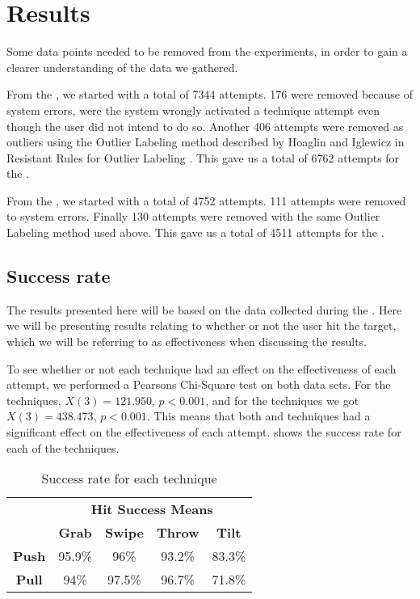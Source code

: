 \section{Results}\label{sec:results}
Some data points needed to be removed from the experiments, in order to gain a clearer understanding of the data we gathered. 

From the \target, we started with a total of 7344 attempts.
176 were removed because of system errors, were the system wrongly activated a technique attempt even though the user did not intend to do so.
Another 406 attempts were removed as outliers using the Outlier Labeling method described by Hoaglin and Iglewicz in Resistant Rules for Outlier Labeling \cite{Hoaglin:1987}.
This gave us a total of 6762 attempts for the \target.

From the \accuracy, we started with a total of 4752 attempts.
111 attempts were removed to system errors. 
Finally 130 attempts were removed with the same Outlier Labeling method used above.
This gave us a total of 4511 attempts for the \accuracy.

\subsection{Success rate}
The results presented here will be based on the data collected during the \target. 
Here we will be presenting results relating to whether or not the user hit the target, which we will be referring to as effectiveness when discussing the results. 

To see whether or not each technique had an effect on the effectiveness of each attempt, we performed a Pearsons Chi-Square test on both data sets. 
For the \push techniques, $X(3)=121.950$, $p<0.001$, and for the \pull techniques we got $X(3)=438.473$, $p<0.001$. 
This means that both \push and \pull techniques had a significant effect on the effectiveness of each attempt. 
 shows the success rate for each of the techniques. 

\begin{table}[H]
	\centering
		\begin{tabular}{c c c c c}
			\cline{2-5}\T\B
			& \multicolumn{4}{c}{\textbf{Hit Success Means}} \\
			\cline{2-5}\T\B
			& \textbf{Grab} & \textbf{Swipe} & \textbf{Throw} & \textbf{Tilt} \\ \hline \T\B
			\textbf{Push} & 95.9\% & 96\% & 93.2\% & 83.3\% \\ \hline\T\B
			\textbf{Pull} & 94\% & 97.5\% & 96.7\% & 71.8\% \\ \hline
		\end{tabular}
	\caption{Success rate for each technique}
	\label{tab:successRate}
\end{table}

